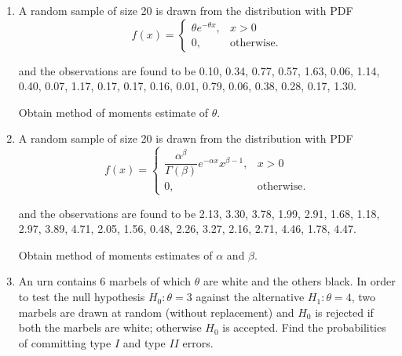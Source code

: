 \documentclass[11pt, a4paper]{article}
\begin{document}
\begin{enumerate}
	
	
	
	
	
	
	\item A random sample of size 20 is drawn from the distribution with PDF
	\begin{equation*}
	 f(x) =
		\begin{cases}
		 \theta e^{-\theta x}, & x > 0  \\
		 0, & \text{otherwise}.
		\end{cases}
	\end{equation*}
	
and the observations are found to be 0.10, 0.34, 0.77, 0.57, 1.63, 0.06, 1.14, 0.40, 0.07, 1.17, 0.17, 0.17, 0.16, 0.01, 0.79, 0.06, 0.38, 0.28, 0.17, 1.30.

Obtain method of moments estimate of $\theta$.
	
	
	
	
	
	\item A random sample of size 20 is drawn from the distribution with PDF
	\begin{equation*}
	 f(x) =
		\begin{cases}
		 \dfrac{\alpha^{\beta}}{\Gamma(\beta)} e^{-\alpha x}x^{\beta - 1}, & x > 0  \\
		 0, & \text{otherwise}.
		\end{cases}
	\end{equation*}
	
and the observations are found to be 2.13, 3.30, 3.78, 1.99, 2.91, 1.68, 1.18, 2.97, 3.89, 4.71, 2.05, 1.56, 0.48, 2.26, 3.27, 2.16, 2.71, 4.46, 1.78, 4.47.

Obtain method of moments estimates of $\alpha$ and $\beta$.







	\item An urn contains 6 marbels of which $\theta$ are white and the others black. In order to test the null hypothesis $H_0 : \theta = 3$ against the alternative $H_1 : \theta = 4$, two marbels are drawn at random (without replacement) and $H_0$ is rejected if both the marbels are white; otherwise $H_0$ is accepted. Find the probabilities of committing type $I$ and type $II$ errors.
	
	
	
	
	
	
	
	
	

\end{enumerate}
\end{document}
